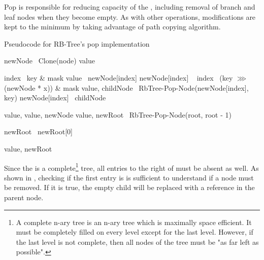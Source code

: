 Pop is responsible for reducing capacity of the \rbtree{}, including removal of branch and leaf nodes when they become empty. As with other operations, modifications are kept to the minimum by taking advantage of path copying algorithm. 

\begin{listing}[ht!]        
    \caption{Pseudocode for RB-Tree's pop implementation}
    \label{lst:rb-tree-pop}
    
    \begin{algorithmic}
            \State newNode \la\ Clone(node)
            \State value \la\ \nil{}

                \State index \la\ key \& mask
                \State value \la\ newNode[index]
                \State newNode[index] \la\ \nil{}
            \Else                 
                \State index \la\ (key $\ggg$ (newNode * x)) \& mask
                \State value, childNode \la\ RbTree-Pop-Node(newNode[index], key)
                \State newNode[index] \la\ childNode
            \EndIf
            
                \State \Return value, \nil{}
            \Else
                \State \Return value, newNode
            \EndIf
        \EndFunction
        \State        
            \State value, newRoot \la\ RbTree-Pop-Node(root, root - 1)
            
                \State newRoot \la\ newRoot[0]
            \EndIf

            \State \Return value, newRoot
        \EndFunction
    \end{algorithmic}
\end{listing}

Since the \rbtree{} is a complete\footnote{A complete n-ary tree is an n-ary tree which is maximally space efficient. It must be completely filled on every level except for the last level. However, if the last level is not complete, then all nodes of the tree must be "as far left as possible".} tree, all entries to the right of \nil{} must be absent as well. As shown in , checking if the first entry is \nil{} is sufficient to understand if a node must be removed. If it is true, the empty child will be replaced with a \nil{} reference in the parent node. 

